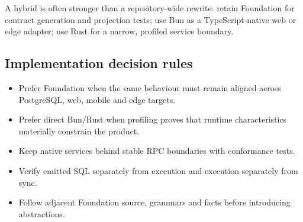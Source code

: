 \documentclass[10pt]{article}
\begin{document}
A hybrid is often stronger than a repository-wide rewrite: retain Foundation for contract generation and projection tests; use Bun as a TypeScript-native web or edge adapter; use Rust for a narrow, profiled service boundary.

\subsection{Implementation decision rules}

\begin{itemize}
  \item Prefer Foundation when the same behaviour must remain aligned across PostgreSQL, web, mobile and edge targets.
  \item Prefer direct Bun/Rust when profiling proves that runtime characteristics materially constrain the product.
  \item Keep native services behind stable RPC boundaries with conformance tests.
  \item Verify emitted SQL separately from execution and execution separately from sync.
  \item Follow adjacent Foundation source, grammars and  facts before introducing abstractions.
\end{itemize}

\end{document}
